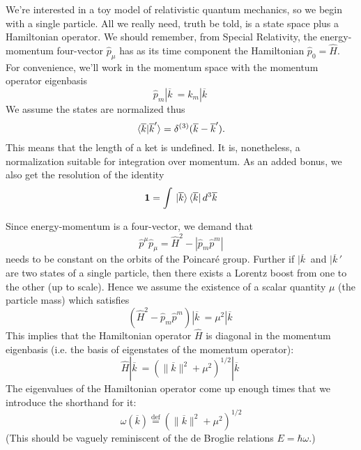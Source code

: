 
We're interested in a toy model of relativistic quantum
mechanics, so we begin with a single particle. All we really
need, truth be told, is a state space plus a Hamiltonian
operator. We should remember, from Special Relativity, the
energy-momentum four-vector $\widehat{p}_{\mu}$ has as its time component the
Hamiltonian $\widehat{p}_{0}=\widehat{H}$. For convenience, we'll
work in the momentum space with the momentum operator eigenbasis
\begin{equation}%
\widehat{p}_{m}|\overline{k}\>=k_{m}|\overline{k}\>
\end{equation}
We assume the states are normalized thus
\begin{equation}%
\<\overline{k}|\overline{k}'\>=\delta^{(3)}(\overline{k}-\overline{k}').
\end{equation}
This means that the length of a ket is undefined. It is,
nonetheless, a normalization suitable for integration over
momentum. As an added bonus, we also get the resolution of the
identity
\begin{equation}%
\mathbf{1}=\int\,|\overline{k}\>\,\<\overline{k}|\,d^{3}\overline{k}
\end{equation}

Since energy-momentum is a four-vector, we demand that
\begin{equation}%
\widehat{p}^{\mu}\widehat{p}_{\mu} = \widehat{H}^{2}-|\widehat{p}_{m}\widehat{p}^{m}|
\end{equation}
needs to be constant on the orbits of the Poincar\'e
group. Further if $|\overline{k}\>$ and $|\overline{k}\,'\>$ are
two states of a single particle, then there exists a Lorentz
boost from one to the other (up to scale). Hence we assume the
existence of a scalar quantity $\mu$ (the particle mass) which
satisfies
\begin{equation}%
(\widehat{H}^{2} - \widehat{p}_{m}\widehat{p}^{m})|\overline{k}\>
= \mu^{2}|\overline{k}\>
\end{equation}
This implies that the Hamiltonian operator $\widehat{H}$ is
diagonal in the momentum eigenbasis (i.e. the basis of
eigenstates of the momentum operator):
\begin{equation}%
\widehat{H}|\overline{k}\> = \left(\|\overline{k}\|^{2}+\mu^{2}\right)^{1/2}|\overline{k}\>
\end{equation}
The eigenvalues of the Hamiltonian operator come up enough times
that we introduce the shorthand for it:
\begin{equation}%
\omega(\overline{k}) \stackrel{\text{def}}{=} \left(\|\overline{k}\|^{2}+\mu^{2}\right)^{1/2}
\end{equation}
(This should be vaguely reminiscent of the de Broglie relations
$E=\hbar\omega$.)

